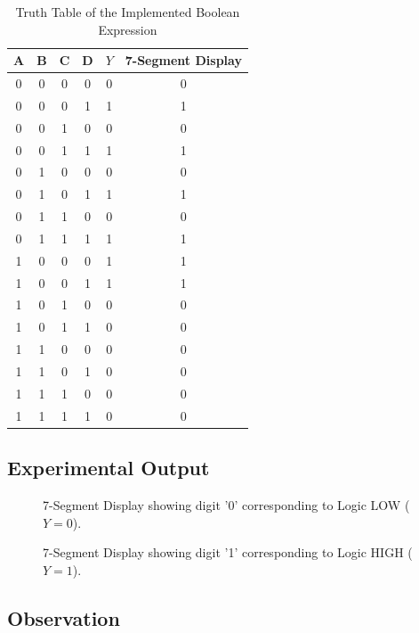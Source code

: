 \documentclass[12pt,a4paper]{article}
\begin{document}
\begin{table}[h]
\centering
\begin{tabular}{|c|c|c|c|c|c|}
\hline
A & B & C & D & $Y$ & 7-Segment Display \\ \hline
0 & 0 & 0 & 0 & 0 & 0 \\ \hline
0 & 0 & 0 & 1 & 1 & 1 \\ \hline
0 & 0 & 1 & 0 & 0 & 0 \\ \hline
0 & 0 & 1 & 1 & 1 & 1 \\ \hline
0 & 1 & 0 & 0 & 0 & 0 \\ \hline
0 & 1 & 0 & 1 & 1 & 1 \\ \hline
0 & 1 & 1 & 0 & 0 & 0 \\ \hline
0 & 1 & 1 & 1 & 1 & 1 \\ \hline
1 & 0 & 0 & 0 & 1 & 1 \\ \hline
1 & 0 & 0 & 1 & 1 & 1 \\ \hline
1 & 0 & 1 & 0 & 0 & 0 \\ \hline
1 & 0 & 1 & 1 & 0 & 0 \\ \hline
1 & 1 & 0 & 0 & 0 & 0 \\ \hline
1 & 1 & 0 & 1 & 0 & 0 \\ \hline
1 & 1 & 1 & 0 & 0 & 0 \\ \hline
1 & 1 & 1 & 1 & 0 & 0 \\ \hline
\end{tabular}
\caption{Truth Table of the Implemented Boolean Expression}
\label{tab:truth_table}
\end{table}

\subsection*{Experimental Output}

\begin{figure}[h]
\centering
\caption{7-Segment Display showing digit '0' corresponding to Logic LOW ($Y=0$).}
\label{fig:display0}
\end{figure}

\begin{figure}[h]
\centering
\caption{7-Segment Display showing digit '1' corresponding to Logic HIGH ($Y=1$).}
\label{fig:display1}
\end{figure}

\subsection*{Observation}
\end{document}
